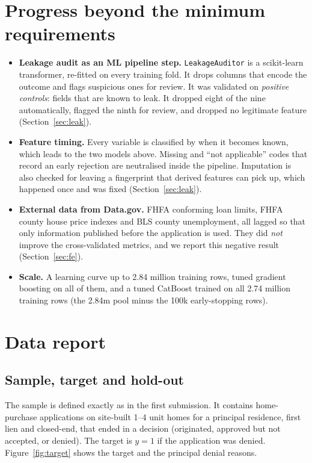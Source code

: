 \documentclass[11pt,a4paper]{article}
\begin{document}
\section{Progress beyond the minimum requirements}
\begin{itemize}
  \item \textbf{Leakage audit as an ML pipeline step.} \texttt{LeakageAuditor} is a scikit-learn
  transformer, re-fitted on every training fold. It drops columns that encode the outcome
  and flags suspicious ones for review. It was validated on \emph{positive controls}: fields
  that are known to leak. It dropped eight of the nine automatically, flagged the ninth for
  review, and dropped no legitimate feature (Section~\ref{sec:leak}).
  \item \textbf{Feature timing.} Every variable is classified by when it becomes known, which
  leads to the two models above. Missing and ``not applicable'' codes that record an early
  rejection are neutralised inside the pipeline. Imputation is also checked for leaving a
  fingerprint that derived features can pick up, which happened once and was fixed
  (Section~\ref{sec:leak}).
  \item \textbf{External data from Data.gov.} FHFA conforming loan limits, FHFA county house
  price indexes and BLS county unemployment, all lagged so that only information published
  before the application is used. They did \emph{not} improve the cross-validated metrics,
  and we report this negative result (Section~\ref{sec:fe}).
  \item \textbf{Scale.} A learning curve up to 2.84 million training rows, tuned gradient
  boosting on all of them, and a tuned CatBoost trained on all 2.74 million training rows
  (the 2.84m pool minus the 100k early-stopping rows).
\end{itemize}

\section{Data report}

\subsection{Sample, target and hold-out}
The sample is defined exactly as in the first submission. It contains home-purchase
applications on site-built 1--4 unit homes for a principal residence, first lien and
closed-end, that ended in a decision (originated, approved but not accepted, or denied).
The target is $y=1$ if the application was denied. Figure~\ref{fig:target} shows the
target and the principal denial reasons.
\end{document}
